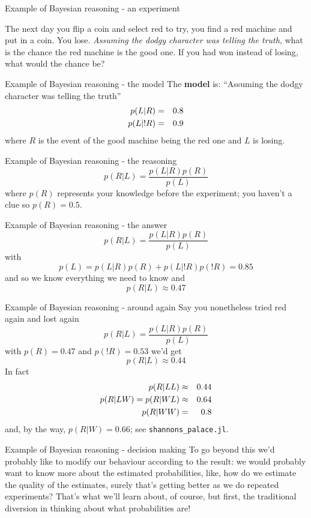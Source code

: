 \documentclass{beamer}
\newcommand{\cored}{\color{red}{}}
\newcommand{\cor}{\color{reddish}{}}
\newcommand{\cob}{\color{black}{}}
\begin{document}
\begin{frame}{Example of Bayesian reasoning - an experiment}
  
  The next day you flip a coin and select \cored{}red\cob{} to try, you find a \cored{}red\cob{} machine
  and put in a coin. You lose. \textsl{Assuming the dodgy character was
  telling the truth}, what is the chance the red machine is the good one. If you had won instead of losing, what would the
  chance be?
\end{frame}

\begin{frame}{Example of Bayesian reasoning - the model}
The \textbf{model} is: ``Assuming the dodgy character was
telling the truth''
\cor
\begin{eqnarray*}
  p(L|R)&=&0.8\cr
  p(L|!R)&=&0.9
\end{eqnarray*}
where \cor{}$R$\cob{} is the event of the good machine being the \cored{}red\cob{} one and \cor{}$L$\cob{} is losing.
\end{frame}

\begin{frame}{Example of Bayesian reasoning - the reasoning}
  \cor
  $$p(R|L)=\frac{p(L|R)p(R)}{p(L)}$$ \cob
where \cor$p(R)$\cob{} represents your knowledge before the experiment; you haven't a clue so \cor$p(R)=0.5$\cob{}.
\end{frame}


\begin{frame}{Example of Bayesian reasoning - the answer}
  \cor
  $$p(R|L)=\frac{p(L|R)p(R)}{p(L)}$$ \cob
  with\cor{}
  $$p(L)=p(L|R)p(R)+p(L|!R)p(!R)=0.85$$\cob{}
  and so we know everything we need to know and\cor{}
  $$p(R|L)\approx 0.47$$
  \cob{}
\end{frame}


\begin{frame}{Example of Bayesian reasoning - around again}
Say you nonetheless tried \cored{}red\cob{} again and lost again
  \cor
  $$p(R|L)=\frac{p(L|R)p(R)}{p(L)}$$ \cob
  with \cor{}$p(R)=0.47$\cob{} and \cor{}$p(!R)=0.53$\cob{}
  we'd get\cor{}
  $$p(R|L)\approx 0.44$$
  \cob{}
  In fact \cor{}
  \begin{eqnarray*}
    p(R|LL)&\approx& 0.44\cr
    p(R|LW)=p(R|WL)&\approx& 0.64\cr
    p(R|WW)&=&0.8
  \end{eqnarray*}
  \cob{}and, by the way, \cor$p(R|W)=0.66$\cob{}; see \texttt{shannons\_palace.jl}.
\end{frame}

\begin{frame}{Example of Bayesian reasoning - decision making}
  To go beyond this we'd probably like to modify our behaviour
  according to the result: we would probably want to know more about
  the estimated probabilities, like, how do we estimate the quality of
  the estimates, surely that's getting better as we do repeated
  experiments? That's what we'll learn about, of course, but first,
  the traditional diversion in thinking about what probabilities are!
  \end{frame}
\end{document}
